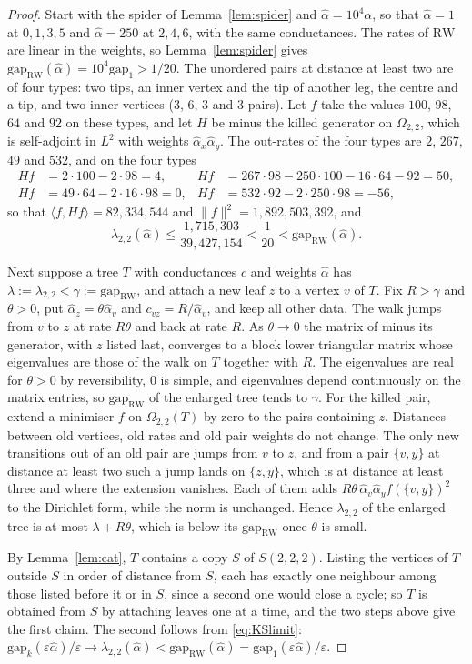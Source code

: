 \documentclass[11pt]{article}
\theoremstyle{remark}
\newcommand{\gap}{\mathrm{gap}}
\newcommand{\RW}{\mathrm{RW}}
\newcommand{\eps}{\varepsilon}
\begin{document}
\begin{proof}
Start with the spider of Lemma~\ref{lem:spider} and $\hat\alpha=10^4\alpha$, so that $\hat\alpha=1$ at $0,1,3,5$ and $\hat\alpha=250$ at $2,4,6$, with the same conductances. The rates of $\RW$ are linear in the weights, so Lemma~\ref{lem:spider} gives $\gap_{\RW}(\hat\alpha)=10^4\gap_1>1/20$. The unordered pairs at distance at least two are of four types: two tips, an inner vertex and the tip of another leg, the centre and a tip, and two inner vertices ($3$, $6$, $3$ and $3$ pairs). Let $f$ take the values $100$, $98$, $64$ and $92$ on these types, and let $H$ be minus the killed generator on $\Omega_{2,2}$, which is self-adjoint in $L^2$ with weights $\hat\alpha_x\hat\alpha_y$. The out-rates of the four types are $2$, $267$, $49$ and $532$, and on the four types
\begin{align*}
Hf&=2\cdot100-2\cdot98=4, & Hf&=267\cdot98-250\cdot100-16\cdot64-92=50,\\
Hf&=49\cdot64-2\cdot16\cdot98=0, & Hf&=532\cdot92-2\cdot250\cdot98=-56,
\end{align*}
so that $\langle f,Hf\rangle=82{,}334{,}544$ and $\|f\|^2=1{,}892{,}503{,}392$, and
\[
\lambda_{2,2}(\hat\alpha)\le\frac{1{,}715{,}303}{39{,}427{,}154}<\frac1{20}<\gap_{\RW}(\hat\alpha).
\]

Next suppose a tree $T$ with conductances $c$ and weights $\hat\alpha$ has $\lambda:=\lambda_{2,2}<\gamma:=\gap_{\RW}$, and attach a new leaf $z$ to a vertex $v$ of $T$. Fix $R>\gamma$ and $\theta>0$, put $\hat\alpha_z=\theta\hat\alpha_v$ and $c_{vz}=R/\hat\alpha_v$, and keep all other data. The walk jumps from $v$ to $z$ at rate $R\theta$ and back at rate $R$. As $\theta\to0$ the matrix of minus its generator, with $z$ listed last, converges to a block lower triangular matrix whose eigenvalues are those of the walk on $T$ together with $R$. The eigenvalues are real for $\theta>0$ by reversibility, $0$ is simple, and eigenvalues depend continuously on the matrix entries, so $\gap_{\RW}$ of the enlarged tree tends to $\gamma$. For the killed pair, extend a minimiser $f$ on $\Omega_{2,2}(T)$ by zero to the pairs containing $z$. Distances between old vertices, old rates and old pair weights do not change. The only new transitions out of an old pair are jumps from $v$ to $z$, and from a pair $\{v,y\}$ at distance at least two such a jump lands on $\{z,y\}$, which is at distance at least three and where the extension vanishes. Each of them adds $R\theta\,\hat\alpha_v\hat\alpha_y f(\{v,y\})^2$ to the Dirichlet form, while the norm is unchanged. Hence $\lambda_{2,2}$ of the enlarged tree is at most $\lambda+R\theta$, which is below its $\gap_{\RW}$ once $\theta$ is small.

By Lemma~\ref{lem:cat}, $T$ contains a copy $S$ of $S(2,2,2)$. Listing the vertices of $T$ outside $S$ in order of distance from $S$, each has exactly one neighbour among those listed before it or in $S$, since a second one would close a cycle; so $T$ is obtained from $S$ by attaching leaves one at a time, and the two steps above give the first claim. The second follows from \eqref{eq:KSlimit}: $\gap_k(\eps\hat\alpha)/\eps\to\lambda_{2,2}(\hat\alpha)<\gap_{\RW}(\hat\alpha)=\gap_1(\eps\hat\alpha)/\eps$.
\end{proof}
\end{document}
